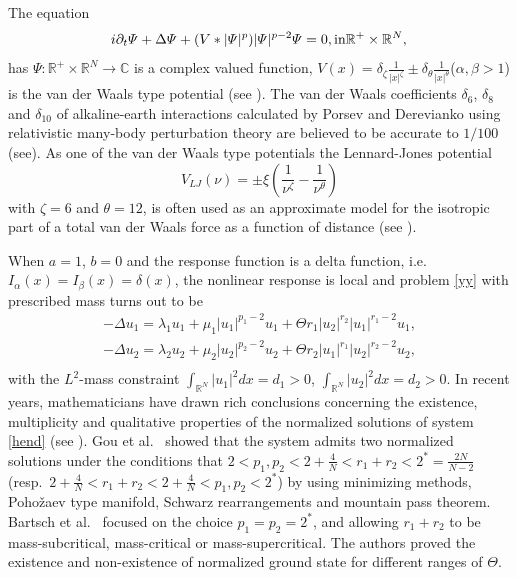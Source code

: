 \documentclass[reqno]{amsart}
\begin{document}
The equation
\begin{equation}\label{yyu5}
 i\partial_t\varPsi+\Delta \varPsi+(V\ast|\varPsi|^p)|\varPsi|^{p-2}\varPsi=0,    \text{in} \mathbb{R}^+\times\mathbb{R}^N,\\
 \end{equation}
has $\varPsi:\mathbb{R}^+\times\mathbb{R}^N\to \mathbb{C}$ is a complex
valued function, $V(x)=\delta_{\zeta}\frac{1}{|x|^\zeta}\pm
 \delta_{\theta}\frac{1}{|x|^\theta}$($\alpha,\beta>1$)
is the van der Waals type potential (see \cite{VWp3,BZd27}).
The van der Waals coefficients
$\delta_6$, $\delta_8$ and $\delta_{10}$ of alkaline-earth interactions
calculated by Porsev and Derevianko using relativistic many-body perturbation
theory are believed to be accurate to $1/100$ (see\cite{cfrv}).
As one of the van der Waals type potentials the Lennard-Jones potential
\[
 V_{LJ}(\nu)=\pm\xi(\frac{1}{\nu^\zeta }-\frac{1}{\nu^\theta})
\]
with $\zeta =6$ and $\theta=12$, is often used as an approximate model for the
isotropic part of a total van der
 Waals force as a function of distance (see \cite{VWp3,BZd27}).

When $a=1$, $b=0$ and the response function is a delta function, i.e.\
$I_\alpha(x)=I_\beta(x)=\delta(x)$, the nonlinear response is local and
problem \eqref{yy} with
prescribed mass turns out to be
\begin{equation}\label{hend}
\begin{gathered}
-\Delta u_1=\lambda_1 u_1+\mu_1|u_1|^{p_1-2}u_1+
 \Theta r_1|u_2|^{r_2}|u_1|^{r_1-2}u_1, \\
-\Delta u_2=\lambda_2 u_2+\mu_2|u_2|^{p_2-2}u_2+
 \Theta r_2|u_1|^{r_1}|u_2|^{r_2-2}u_2, \\
\end{gathered}
\end{equation}
with the $L^2$-mass constraint
$\int_{\mathbb{R}^N}|u_1|^2dx=d_1>0$, $\int_{\mathbb{R}^N}|u_2|^2dx=d_2>0$.
In recent years, mathematicians have drawn rich conclusions
concerning the existence, multiplicity and qualitative properties of
the normalized solutions of system \eqref{hend}
(see \cite{Huij1,Huij2,Huij3,Huij4,Huij5,Huij6}).
Gou et al.\ \cite{Huij6} showed that
the system admits two normalized solutions under the conditions that
$2<p_1,p_2<2+\frac{4}{N}<r_1+r_2<2^*=\frac{2N}{N-2}$
(resp.\ $2+\frac{4}{N}<r_1+r_2<2+\frac{4}{N}<p_1,p_2<2^*$)
by using minimizing methods, Poho\v{z}aev type manifold, Schwarz rearrangements
and mountain pass theorem.
Bartsch et al.\ \cite{Huij4} focused on the choice $p_1=p_2=2^*$, and allowing
$r_1+r_2$ to be mass-subcritical, mass-critical or mass-supercritical.
The authors proved the existence and non-existence of normalized ground state for
different ranges of $\Theta$.
\end{document}

